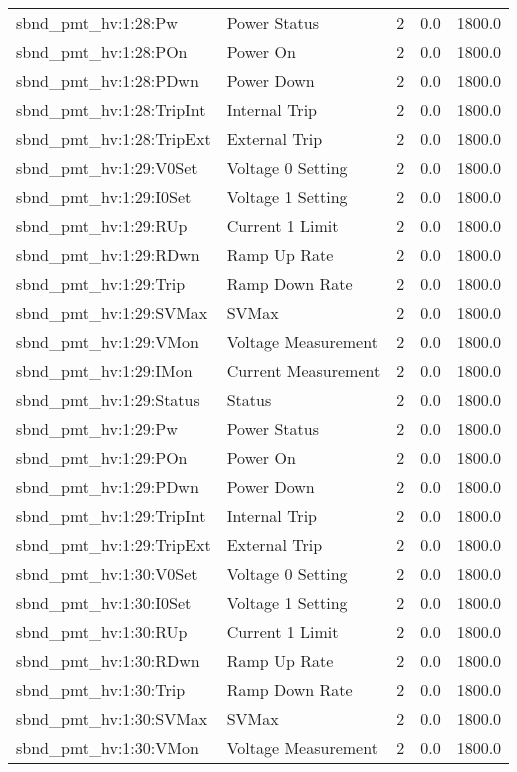 \begin{center}
\begin{longtable}{l | l l l l }
sbnd\_pmt\_hv:1:28:Pw & Power Status & 2 & 0.0 & 1800.0\\ 
sbnd\_pmt\_hv:1:28:POn & Power On & 2 & 0.0 & 1800.0\\ 
sbnd\_pmt\_hv:1:28:PDwn & Power Down & 2 & 0.0 & 1800.0\\ 
sbnd\_pmt\_hv:1:28:TripInt & Internal Trip & 2 & 0.0 & 1800.0\\ 
sbnd\_pmt\_hv:1:28:TripExt & External Trip & 2 & 0.0 & 1800.0\\ 
sbnd\_pmt\_hv:1:29:V0Set & Voltage 0 Setting & 2 & 0.0 & 1800.0\\ 
sbnd\_pmt\_hv:1:29:I0Set & Voltage 1 Setting & 2 & 0.0 & 1800.0\\ 
sbnd\_pmt\_hv:1:29:RUp & Current 1 Limit & 2 & 0.0 & 1800.0\\ 
sbnd\_pmt\_hv:1:29:RDwn & Ramp Up Rate & 2 & 0.0 & 1800.0\\ 
sbnd\_pmt\_hv:1:29:Trip & Ramp Down Rate & 2 & 0.0 & 1800.0\\ 
sbnd\_pmt\_hv:1:29:SVMax & SVMax & 2 & 0.0 & 1800.0\\ 
sbnd\_pmt\_hv:1:29:VMon & Voltage Measurement & 2 & 0.0 & 1800.0\\ 
sbnd\_pmt\_hv:1:29:IMon & Current Measurement & 2 & 0.0 & 1800.0\\ 
sbnd\_pmt\_hv:1:29:Status & Status & 2 & 0.0 & 1800.0\\ 
sbnd\_pmt\_hv:1:29:Pw & Power Status & 2 & 0.0 & 1800.0\\ 
sbnd\_pmt\_hv:1:29:POn & Power On & 2 & 0.0 & 1800.0\\ 
sbnd\_pmt\_hv:1:29:PDwn & Power Down & 2 & 0.0 & 1800.0\\ 
sbnd\_pmt\_hv:1:29:TripInt & Internal Trip & 2 & 0.0 & 1800.0\\ 
sbnd\_pmt\_hv:1:29:TripExt & External Trip & 2 & 0.0 & 1800.0\\ 
sbnd\_pmt\_hv:1:30:V0Set & Voltage 0 Setting & 2 & 0.0 & 1800.0\\ 
sbnd\_pmt\_hv:1:30:I0Set & Voltage 1 Setting & 2 & 0.0 & 1800.0\\ 
sbnd\_pmt\_hv:1:30:RUp & Current 1 Limit & 2 & 0.0 & 1800.0\\ 
sbnd\_pmt\_hv:1:30:RDwn & Ramp Up Rate & 2 & 0.0 & 1800.0\\ 
sbnd\_pmt\_hv:1:30:Trip & Ramp Down Rate & 2 & 0.0 & 1800.0\\ 
sbnd\_pmt\_hv:1:30:SVMax & SVMax & 2 & 0.0 & 1800.0\\ 
sbnd\_pmt\_hv:1:30:VMon & Voltage Measurement & 2 & 0.0 & 1800.0\\ 

\end{longtable}
\end{center}
